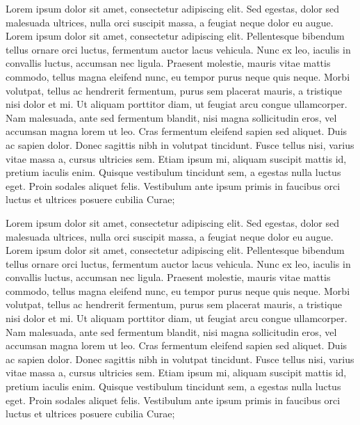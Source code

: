 \documentclass{article}
\begin{document}
\begin{pairs}
\begin{Rightside}
        \pstart
Lorem ipsum dolor sit amet, consectetur adipiscing elit. Sed egestas, dolor sed malesuada ultrices, nulla orci suscipit massa, a feugiat neque dolor eu augue. Lorem ipsum dolor sit amet, consectetur adipiscing elit. Pellentesque bibendum tellus ornare orci luctus, fermentum auctor lacus vehicula. Nunc ex leo, iaculis in convallis luctus, accumsan nec ligula. Praesent molestie, mauris vitae mattis commodo, tellus magna eleifend nunc, eu tempor purus neque quis neque. Morbi volutpat, tellus ac hendrerit fermentum, purus sem placerat mauris, a tristique nisi dolor et mi. Ut aliquam porttitor diam, ut feugiat arcu congue ullamcorper. Nam malesuada, ante sed fermentum blandit, nisi magna sollicitudin eros, vel accumsan magna lorem ut leo. Cras fermentum eleifend sapien sed aliquet. Duis ac sapien dolor. Donec sagittis nibh in volutpat tincidunt. Fusce tellus nisi, varius vitae massa a, cursus ultricies sem. Etiam ipsum mi, aliquam suscipit mattis id, pretium iaculis enim. Quisque vestibulum tincidunt sem, a egestas nulla luctus eget. Proin sodales aliquet felis. Vestibulum ante ipsum primis in faucibus orci luctus et ultrices posuere cubilia Curae;

        \pend

\endnumbering
\end{Rightside}
\end{pairs}
\Columns
\beginnumbering




            \pstart
Lorem ipsum dolor sit amet, consectetur adipiscing elit. Sed egestas, dolor sed malesuada ultrices, nulla orci suscipit massa, a feugiat neque dolor eu augue. Lorem ipsum dolor sit amet, consectetur adipiscing elit. Pellentesque bibendum tellus ornare orci luctus, fermentum auctor lacus vehicula. Nunc ex leo, iaculis in convallis luctus, accumsan nec ligula. Praesent molestie, mauris vitae mattis commodo, tellus magna eleifend nunc, eu tempor purus neque quis neque. Morbi volutpat, tellus ac hendrerit fermentum, purus sem placerat mauris, a tristique nisi dolor et mi. Ut aliquam porttitor diam, ut feugiat arcu congue ullamcorper. Nam malesuada, ante sed fermentum blandit, nisi magna sollicitudin eros, vel accumsan magna lorem ut leo. Cras fermentum eleifend sapien sed aliquet. Duis ac sapien dolor. Donec sagittis nibh in volutpat tincidunt. Fusce tellus nisi, varius vitae massa a, cursus ultricies sem. Etiam ipsum mi, aliquam suscipit mattis id, pretium iaculis enim. Quisque vestibulum tincidunt sem, a egestas nulla luctus eget. Proin sodales aliquet felis. Vestibulum ante ipsum primis in faucibus orci luctus et ultrices posuere cubilia Curae;

        \pend
    \endnumbering
\end{document}
